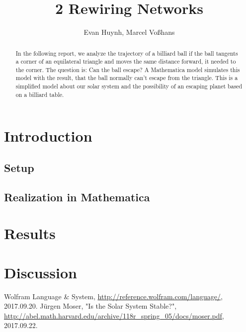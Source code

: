 \documentclass[11pt,a4paper]{article}
\begin{document}
\title{2 Rewiring Networks}
\author{Evan Huynh, Marcel Vo{\ss}hans}
\maketitle

\begin{abstract}
In the following report, we analyze the trajectory of a billiard ball if the ball tangents a corner of an equilateral triangle and moves the same distance forward, it needed to the corner. The question is: Can the ball escape? A Mathematica model simulates this model with the result, that the ball normally can't escape from the triangle. This is a simplified model about our solar system and the possibility of an escaping planet based on a billiard table.
\end{abstract}

\tableofcontents

\section{Introduction}
\subsection{Setup}

\subsection{Realization in Mathematica}
\section{Results}
\section{Discussion}

\begin{thebibliography}{2}

 Wolfram Language \& System, \url{http://reference.wolfram.com/language/}, 2017.09.20.
  J{\"u}rgen Moser, "Is the Solar System Stable?", \url{http://abel.math.harvard.edu/archive/118r_spring_05/docs/moser.pdf}, 2017.09.22.

\end{thebibliography}
\end{document}
